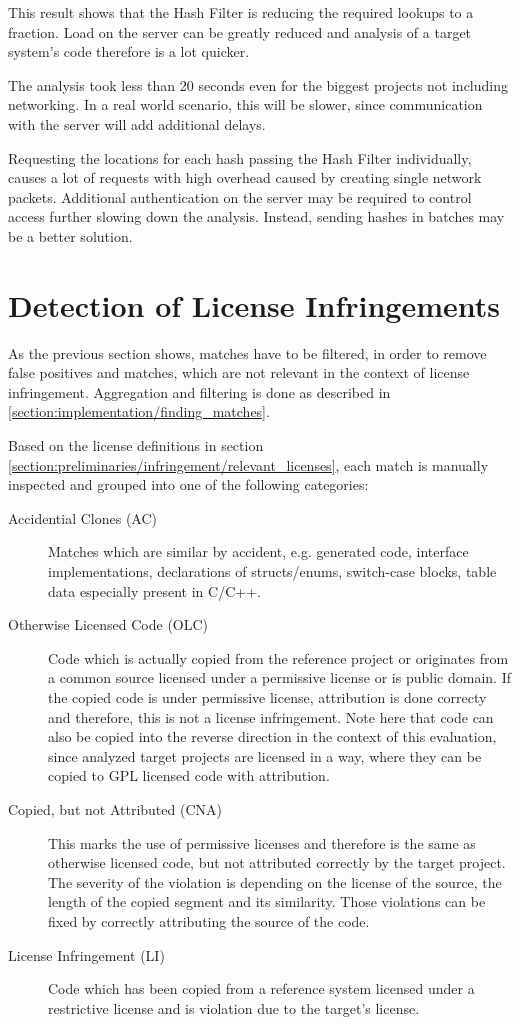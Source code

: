 This result shows that the Hash Filter is reducing the required lookups to a fraction.
Load on the server can be greatly reduced and analysis of a target system's code therefore is a lot quicker.

The analysis took less than 20 seconds even for the biggest projects not including networking.
In a real world scenario, this will be slower, since communication with the server will add additional delays.

Requesting the locations for each hash passing the Hash Filter individually, causes a lot of requests with high overhead caused by creating single network packets.
Additional authentication on the server may be required to control access further slowing down the analysis.
Instead, sending hashes in batches may be a better solution.

\newpage
\section{Detection of License Infringements}\label{section:evaluation/detecting_infringements}
As the previous section shows, matches have to be filtered, in order to remove false positives and matches, which are not relevant in the context of license infringement.
Aggregation and filtering is done as described in \autoref{section:implementation/finding_matches}.

Based on the license definitions in section \ref{section:preliminaries/infringement/relevant_licenses}, each match is manually inspected and grouped into one of the following categories:
\begin{description}
	\item [Accidential Clones (AC)]
		Matches which are similar by \glqq accident\grqq, e.g. generated code, interface implementations, declarations of structs/enums, switch-case blocks, table data especially present in C/C++.
	\item[Otherwise Licensed Code (OLC)]
		Code which is actually copied from the reference project or originates from a common source licensed under a permissive license or is public domain.
		If the copied code is under permissive license, attribution is done correcty and therefore, this is not a license infringement.
		Note here that code can also be copied into the reverse direction in the context of this evaluation, since analyzed target projects are licensed in a way, where they can be copied to GPL licensed code with attribution.
	\item[Copied, but not Attributed (CNA)]
		This marks the use of permissive licenses and therefore is the same as otherwise licensed code, but not attributed correctly by the target project.
		The severity of the violation is depending on the license of the source, the length of the copied segment and its similarity.
		Those violations can be fixed by correctly attributing the source of the code.
	\item[License Infringement (LI)]
		Code which has been copied from a reference system licensed under a restrictive license and is violation due to the target's license.
\end{description}

